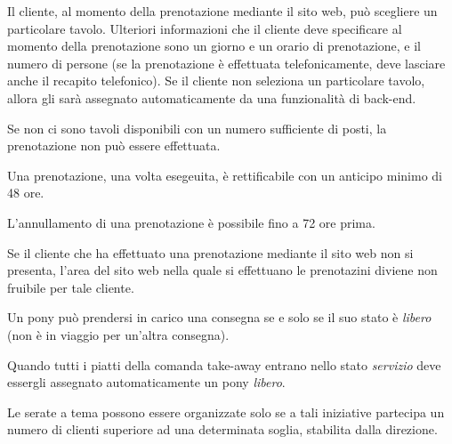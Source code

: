 \begin{enumbusinessrules}
\item Il cliente, al momento della prenotazione mediante il sito web, può scegliere un particolare tavolo. Ulteriori informazioni che il cliente deve specificare al momento della prenotazione sono un giorno e un orario di prenotazione, e il numero di persone (se la prenotazione è effettuata telefonicamente, deve lasciare anche il recapito telefonico). Se il cliente non seleziona un particolare tavolo, allora gli sarà assegnato automaticamente da una funzionalità di back-end.
\item Se non ci sono tavoli disponibili con un numero sufficiente di posti, la prenotazione non può essere effettuata.
\item Una prenotazione, una volta esegeuita, è rettificabile con un anticipo minimo di 48 ore.
\item L'annullamento di una prenotazione è possibile fino a 72 ore prima.
\item Se il cliente che ha effettuato una prenotazione mediante il sito web non si presenta, l'area del sito web nella quale si effettuano le prenotazini diviene non fruibile per tale cliente.
\item Un pony può prendersi in carico una consegna se e solo se il suo stato è {\it libero} (non è in viaggio per un'altra consegna).
\item Quando tutti i piatti della comanda take-away entrano nello stato {\it servizio} deve essergli assegnato automaticamente un pony {\it libero}.
\item Le serate a tema possono essere organizzate solo se a tali iniziative partecipa un numero di clienti superiore ad una determinata soglia, stabilita dalla direzione.
\end{enumbusinessrules}
